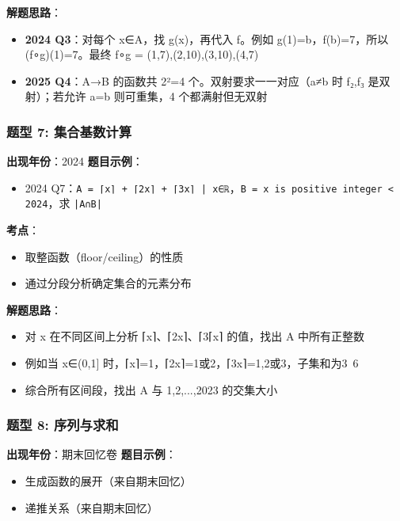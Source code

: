 \documentclass[10pt,a4paper,openany]{ctexbook}
\theoremstyle{definition}
\theoremstyle{remark}
\begin{document}
\textbf{解题思路}：
\begin{itemize}
\item \textbf{2024 Q3}：对每个 x∈A，找 g(x)，再代入 f。例如 g(1)=b，f(b)=7，所以 (f∘g)(1)=7。最终 f∘g = {(1,7),(2,10),(3,10),(4,7)}
\item \textbf{2025 Q4}：A→B 的函数共 2²=4 个。双射要求一一对应（a≠b 时 f₂,f₃ 是双射）；若允许 a=b 则可重集，4 个都满射但无双射

\end{itemize}

\vspace{-2pt}

\subsubsection{题型 7: 集合基数计算}

\textbf{出现年份}：2024
\textbf{题目示例}：
\begin{itemize}
\item 2024 Q7：\texttt{A = {⌈x⌉ + ⌈2x⌉ + ⌈3x⌉ | x∈ℝ}}，\texttt{B = {x is positive integer < 2024}}，求 \texttt{|A∩B|}

\end{itemize}

\textbf{考点}：
\begin{itemize}
\item 取整函数（floor/ceiling）的性质
\item 通过分段分析确定集合的元素分布

\end{itemize}

\textbf{解题思路}：
\begin{itemize}
\item 对 x 在不同区间上分析 ⌈x⌉、⌈2x⌉、⌈3⌈x⌉ 的值，找出 A 中所有正整数
\item 例如当 x∈(0,1] 时，⌈x⌉=1，⌈2x⌉=1或2，⌈3x⌉=1,2或3，子集和为3~6
\item 综合所有区间段，找出 A 与 {1,2,...,2023} 的交集大小

\end{itemize}

\vspace{-2pt}

\subsubsection{题型 8: 序列与求和}

\textbf{出现年份}：期末回忆卷
\textbf{题目示例}：
\begin{itemize}
\item 生成函数的展开（来自期末回忆）
\item 递推关系（来自期末回忆）

\end{itemize}
\end{document}
